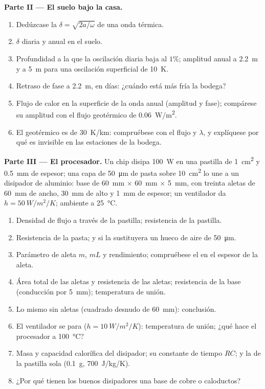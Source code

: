 \begin{problem}
\textbf{Parte II --- El suelo bajo la casa.}
\begin{enumerate}[resume]
  \item Dedúzcase la  $\delta = \sqrt{2a/\omega}$ de una
        onda térmica.
  \item $\delta$ diaria y anual en el suelo.
  \item Profundidad a la que la oscilación diaria baja al $1\%$; amplitud
        anual a \qty{2.2}{m} y a \qty{5}{m} para una oscilación superficial de \qty{10}{K}.
  \item Retraso de fase a \qty{2.2}{m}, en días: ¿cuándo está más fría la bodega?
  \item Flujo de calor en la superficie de la onda anual (amplitud y fase);
        compárese su amplitud con el flujo geotérmico de \qty{0.06}{W/m^2}.
  \item El  geotérmico es de \qty{30}{K/km}: compruébese con el
        flujo y $\lambda$, y explíquese por qué es invisible en las
        estaciones de la bodega.
\end{enumerate}

\textbf{Parte III --- El procesador.}
Un chip disipa \qty{100}{W} en una pastilla de \qty{1}{cm^2} y \qty{0.5}{mm}
de espesor; una capa de \qty{50}{\micro m} de pasta sobre \qty{10}{cm^2} lo une
a un disipador de aluminio: base de \qty{60}{mm} $\times$ \qty{60}{mm} $\times$
\qty{5}{mm}, con treinta aletas de \qty{60}{mm} de ancho, \qty{30}{mm} de alto y \qty{1}{mm}
de espesor; un ventilador da $h = \qty{50}{W/m^2/K}$; ambiente a \qty{25}{\celsius}.
\begin{enumerate}[resume]
  \item Densidad de flujo a través de la pastilla; resistencia de la pastilla.
  \item Resistencia de la pasta; y si la sustituyera un hueco de aire de \qty{50}{\micro m}.
  \item Parámetro de aleta $m$, $mL$ y rendimiento; compruébese el 
        en el espesor de la aleta.
  \item Área total de las aletas y resistencia de las aletas; resistencia de
        la base (conducción por \qty{5}{mm}); temperatura de unión.
  \item Lo mismo sin aletas (cuadrado desnudo de \qty{60}{mm}): conclusión.
  \item El ventilador se para ($h = \qty{10}{W/m^2/K}$): temperatura de unión;
        ¿qué hace el procesador a \qty{100}{\celsius}?
  \item Masa y capacidad calorífica del disipador; su constante de tiempo $RC$;
        y la de la pastilla sola (\qty{0.1}{g}, \qty{700}{J/kg/K}).
  \item ¿Por qué tienen los buenos disipadores una base de cobre o caloductos?
\end{enumerate}


\end{problem}
